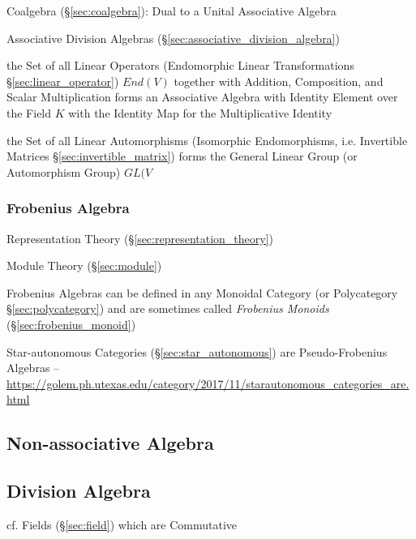 Coalgebra (\S\ref{sec:coalgebra}): Dual to a Unital Associative
Algebra

\fist Associative Division Algebras (\S\ref{sec:associative_division_algebra})

the Set of all Linear Operators (Endomorphic Linear Transformations
\S\ref{sec:linear_operator}) $End(V)$ together with Addition, Composition, and
Scalar Multiplication forms an Associative Algebra with Identity Element over
the Field $K$ with the Identity Map for the Multiplicative Identity

\fist the Set of all Linear Automorphisms (Isomorphic Endomorphisms, i.e.
Invertible Matrices \S\ref{sec:invertible_matrix}) forms the General Linear
Group (or Automorphism Group) $GL(V$



\subsubsection{Frobenius Algebra}\label{sec:frobenius_algebra}

Representation Theory (\S\ref{sec:representation_theory})

Module Theory (\S\ref{sec:module})

Frobenius Algebras can be defined in any Monoidal Category (or
Polycategory \S\ref{sec:polycategory}) and are sometimes called
\emph{Frobenius Monoids} (\S\ref{sec:frobenius_monoid})

Star-autonomous Categories (\S\ref{sec:star_autonomous}) are Pseudo-Frobenius
Algebras
--\url{https://golem.ph.utexas.edu/category/2017/11/starautonomous_categories_are.html}



\subsection{Non-associative Algebra}
\label{sec:nonassociative_algebra}

\subsection{Division Algebra}\label{sec:division_algebra}

cf. Fields (\S\ref{sec:field}) which are Commutative



